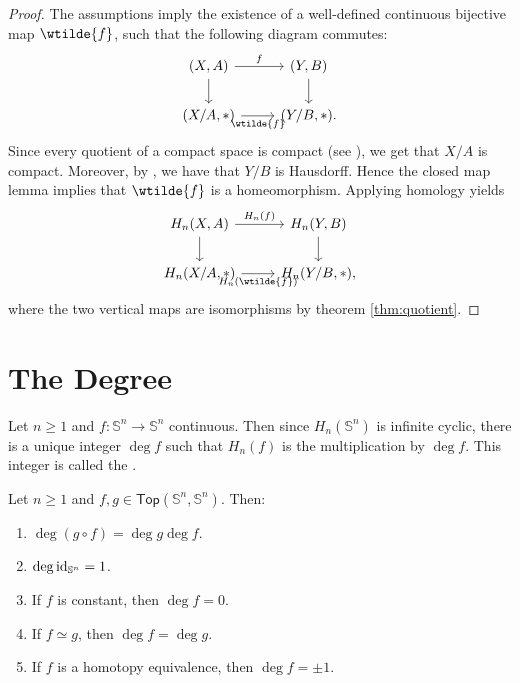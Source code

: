 \begin{proof}
	The assumptions imply the existence of a well-defined continuous bijective map $\wtilde{f}$, such that the following diagram commutes:
	\begin{equation*}
		\begin{tikzcd}
			(X,A) \arrow[d]\arrow[r,"f"] & (Y,B)\arrow[d]\\
			(X/A,\ast) \arrow[r,"\wtilde{f}"'] & (Y/B,\ast).
		\end{tikzcd}
	\end{equation*}
	Since every quotient of a compact space is compact (see \cite[96]{lee:topological_manifolds:2011}), we get that $X/A$ is compact. Moreover, by \cite[102]{lee:topological_manifolds:2011}, we have that $Y/B$ is Hausdorff. Hence the closed map lemma implies that $\wtilde{f}$ is a homeomorphism. Applying homology yields
	\begin{equation*}
		\begin{tikzcd}
			H_n(X,A) \arrow[d]\arrow[r,"H_n(f)"] & H_n(Y,B)\arrow[d]\\
			H_n(X/A,\ast) \arrow[r,"H_n(\wtilde{f})"'] & H_n(Y/B,\ast),
		\end{tikzcd}
	\end{equation*}
	\noindent where the two vertical maps are isomorphisms by theorem \ref{thm:quotient}.	
\end{proof}

\section*{The Degree}
\begin{definition}[Degree]
	Let $n \geq 1$ and $f : \mathbb{S}^n \to \mathbb{S}^n$ continuous. Then since $H_n(\mathbb{S}^n)$ is infinite cyclic, there is a unique integer $\deg f$ such that $H_n(f)$ is the multiplication by $\deg f$. This integer is called the .
\end{definition}

\begin{proposition}
	Let $n \geq 1$ and $f,g \in \mathsf{Top}(\mathbb{S}^n,\mathbb{S}^n)$. Then:
	\begin{enumerate}[label = \textup{(}\alph*\textup{)}]
		\item $\deg(g \circ f) = \deg g \deg f$.
		\item $\deg \operatorname{id}_{\mathbb{S}^n} = 1$.
		\item If $f$ is constant, then $\deg f = 0$.
		\item If $f \simeq g$, then $\deg f = \deg g$.
		\item If $f$ is a homotopy equivalence, then $\deg f = \pm 1$.
	\end{enumerate}
\end{proposition}

